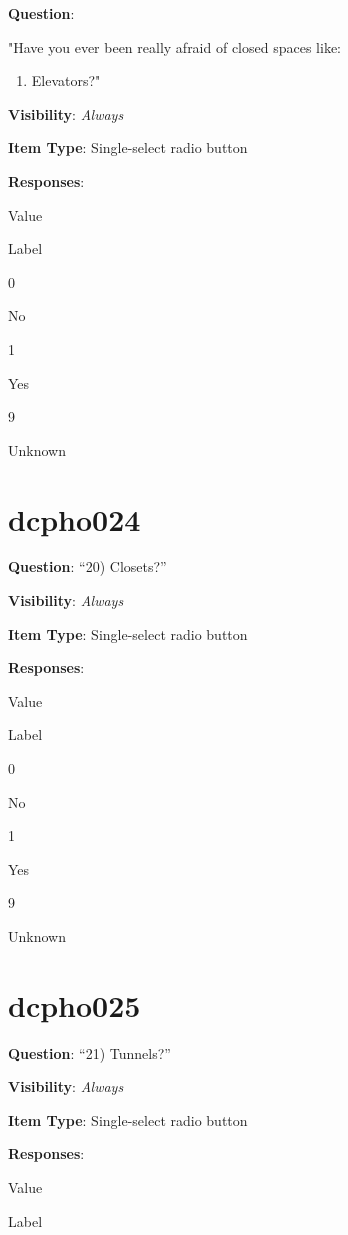 \documentclass[]{book}
\providecommand{\tightlist}{%
  \setlength{\itemsep}{0pt}\setlength{\parskip}{0pt}}
\begin{document}
\textbf{Question}:

"Have you ever been really afraid of closed spaces like:

\begin{enumerate}
\def\labelenumi{\arabic{enumi})}
\setcounter{enumi}{18}
\tightlist
\item
  Elevators?"
\end{enumerate}

\textbf{Visibility}: \emph{Always}

\textbf{Item Type}: Single-select radio button

\textbf{Responses}:

Value

Label

0

No

1

Yes

9

Unknown

\hypertarget{dcpho024}{%
\section{dcpho024}\label{dcpho024}}

\textbf{Question}: ``20) Closets?''

\textbf{Visibility}: \emph{Always}

\textbf{Item Type}: Single-select radio button

\textbf{Responses}:

Value

Label

0

No

1

Yes

9

Unknown

\hypertarget{dcpho025}{%
\section{dcpho025}\label{dcpho025}}

\textbf{Question}: ``21) Tunnels?''

\textbf{Visibility}: \emph{Always}

\textbf{Item Type}: Single-select radio button

\textbf{Responses}:

Value

Label
\end{document}
